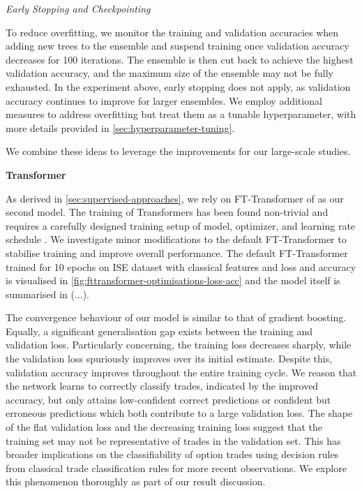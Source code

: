 \emph{Early Stopping and Checkpointing}

To reduce overfitting, we monitor the training and validation accuracies when adding new trees to the ensemble and suspend training once validation accuracy decreases for 100 iterations. The ensemble is then cut back to achieve the highest validation accuracy, and the maximum size of the ensemble may not be fully exhausted. In the experiment above, early stopping does not apply, as validation accuracy continues to improve for larger ensembles. We employ additional measures to address overfitting but treat them as a tunable hyperparameter, with more details provided in \cref{sec:hyperparameter-tuning}.

We combine these ideas to leverage the improvements for our large-scale studies.

\textbf{Transformer}

As derived in \cref{sec:supervised-approaches}, we rely on FT-Transformer of \textcite[][4--5]{gorishniyRevisitingDeepLearning2021} as our second model. The training of Transformers has been found non-trivial and requires a carefully designed training setup of model, optimizer, and learning rate schedule \autocite[][1]{liuUnderstandingDifficultyTraining2020}. We investigate minor modifications to the default FT-Transformer to stabilise training and improve overall performance. The default FT-Transformer trained for 10 epochs on \gls{ISE} dataset with classical features and loss and accuracy is visualised in \cref{fig:fttransformer-optimisations-loss-acc} and the model itself is summarised in (...).

The convergence behaviour of our model is similar to that of gradient boosting. Equally, a significant generalisation gap exists between the training and validation loss. Particularly concerning, the training loss decreases sharply, while the validation loss spuriously improves over its initial estimate. Despite this, validation accuracy improves throughout the entire training cycle. We reason that the network learns to correctly classify trades, indicated by the improved accuracy, but only attains low-confident correct predictions or confident but erroneous predictions which both contribute to a large validation loss. The shape of the flat validation loss and the decreasing training loss suggest that the training set may not be representative of trades in the validation set. This has broader implications on the classifiability of option trades using decision rules from classical trade classification rules for more recent observations. We explore this phenomenon thoroughly as part of our result discussion.

